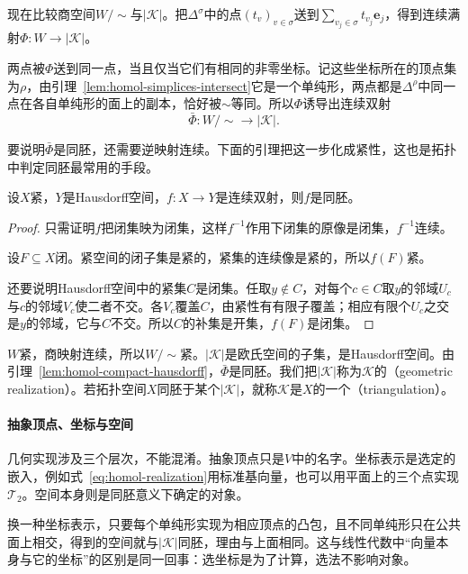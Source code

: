现在比较商空间$W/{\sim}$与$\lvert\mathcal K\rvert$。把$\Delta^\sigma$中的点$(t_v)_{v\in\sigma}$送到$\sum_{v_j\in\sigma}t_{v_j}\bm e_j$，得到连续满射$\Phi:W\to\lvert\mathcal K\rvert$。

两点被$\Phi$送到同一点，当且仅当它们有相同的非零坐标。记这些坐标所在的顶点集为$\rho$，由引理~\ref{lem:homol-simplices-intersect}它是一个单纯形，两点都是$\Delta^\rho$中同一点在各自单纯形的面上的副本，恰好被$\sim$等同。所以$\Phi$诱导出连续双射
\[
 \bar\Phi:W/{\sim}\to\lvert\mathcal K\rvert.
\]

要说明$\bar\Phi$是同胚，还需要逆映射连续。下面的引理把这一步化成紧性，这也是拓扑中判定同胚最常用的手段。

\begin{lemma}[紧空间到Hausdorff空间的连续双射]
\label{lem:homol-compact-hausdorff}
设$X$紧，$Y$是Hausdorff空间，$f:X\to Y$是连续双射，则$f$是同胚。
\end{lemma}

\begin{proof}
只需证明$f$把闭集映为闭集，这样$f^{-1}$作用下闭集的原像是闭集，$f^{-1}$连续。

设$F\subseteq X$闭。紧空间的闭子集是紧的，紧集的连续像是紧的，所以$f(F)$紧。

还要说明Hausdorff空间中的紧集$C$是闭集。任取$y\notin C$，对每个$c\in C$取$y$的邻域$U_c$与$c$的邻域$V_c$使二者不交。各$V_c$覆盖$C$，由紧性有有限子覆盖；相应有限个$U_c$之交是$y$的邻域，它与$C$不交。所以$C$的补集是开集，$f(F)$是闭集。
\end{proof}

$W$紧，商映射连续，所以$W/{\sim}$紧。$\lvert\mathcal K\rvert$是欧氏空间的子集，是Hausdorff空间。由引理~\ref{lem:homol-compact-hausdorff}，$\bar\Phi$是同胚。我们把$\lvert\mathcal K\rvert$称为$\mathcal K$的（geometric realization）。若拓扑空间$X$同胚于某个$\lvert\mathcal K\rvert$，就称$\mathcal K$是$X$的一个（triangulation）。

\paragraph{抽象顶点、坐标与空间}
几何实现涉及三个层次，不能混淆。抽象顶点只是$V$中的名字。坐标表示是选定的嵌入，例如式~\eqref{eq:homol-realization}用标准基向量，也可以用平面上的三个点实现$\mathcal T_2$。空间本身则是同胚意义下确定的对象。

换一种坐标表示，只要每个单纯形实现为相应顶点的凸包，且不同单纯形只在公共面上相交，得到的空间就与$\lvert\mathcal K\rvert$同胚，理由与上面相同。这与线性代数中“向量本身与它的坐标”的区别是同一回事：选坐标是为了计算，选法不影响对象。

